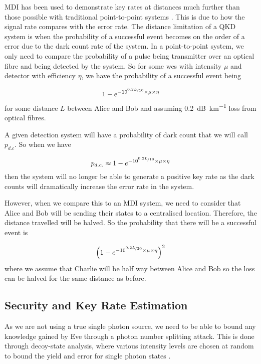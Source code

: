 \Ac{MDI} has been used to demonstrate key rates at distances much further than those possible with traditional point-to-point systems \cite{yin2016}. This is due to how the signal rate compares with the error rate. The distance limitation of a \ac{QKD} system is when the probability of a successful event becomes on the order of a error due to the dark count rate of the system. In a point-to-point system, we only need to compare the probability of a pulse being transmitter over an optical fibre and being detected by the system. So for some \ac{wcs} with intensity $\mu$ and detector with efficiency $\eta$, we have the probability of a successful event being

\begin{equation}
	1 - e^{-10^{\nicefrac{0.2 L}{10}} \times \mu \times \eta}
\end{equation}
for some distance $L$ between Alice and Bob and assuming \SI{0.2}{dB\per\km} loss from optical fibres.

A given detection system will have a probability of dark count that we will call $p_{d.c}$. So when we have

\begin{equation}
	p_{d.c.} \approx 1 - e^{-10^{\nicefrac{0.2 L}{10}} \times \mu \times \eta}
\end{equation}
then the system will no longer be able to generate a positive key rate as the dark counts will dramatically increase the error rate in the system.

However, when we compare this to an \ac{MDI} system, we need to consider that Alice and Bob will be sending their states to a centralised location. Therefore, the distance travelled will be halved. So the probability that there will be a successful event is

\begin{equation}
	\left(1 - e^{-10^{\nicefrac{0.2 L}{20}} \times \mu \times \eta}\right)^2
\end{equation}
where we assume that Charlie will be half way between Alice and Bob so the loss can be halved for the same distance as before.

\subsection{Security and Key Rate Estimation}

As we are not using a true single photon source, we need to be able to bound any knowledge gained by Eve through a photon number splitting attack. This is done through decoy-state analysis, where various intensity levels are chosen at random to bound the yield and error for single photon states \cite{Lo2005}. 

